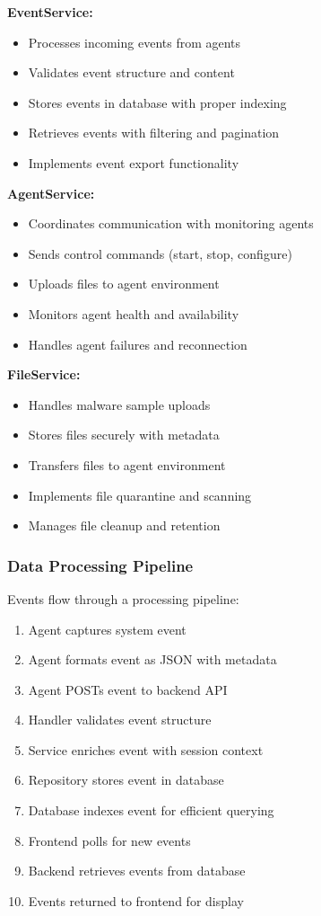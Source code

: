 \textbf{EventService:}
\begin{itemize}
    \item Processes incoming events from agents
    \item Validates event structure and content
    \item Stores events in database with proper indexing
    \item Retrieves events with filtering and pagination
    \item Implements event export functionality
\end{itemize}

\textbf{AgentService:}
\begin{itemize}
    \item Coordinates communication with monitoring agents
    \item Sends control commands (start, stop, configure)
    \item Uploads files to agent environment
    \item Monitors agent health and availability
    \item Handles agent failures and reconnection
\end{itemize}

\textbf{FileService:}
\begin{itemize}
    \item Handles malware sample uploads
    \item Stores files securely with metadata
    \item Transfers files to agent environment
    \item Implements file quarantine and scanning
    \item Manages file cleanup and retention
\end{itemize}

\subsubsection{Data Processing Pipeline}

Events flow through a processing pipeline:

\begin{enumerate}
    \item Agent captures system event
    \item Agent formats event as JSON with metadata
    \item Agent POSTs event to backend API
    \item Handler validates event structure
    \item Service enriches event with session context
    \item Repository stores event in database
    \item Database indexes event for efficient querying
    \item Frontend polls for new events
    \item Backend retrieves events from database
    \item Events returned to frontend for display
\end{enumerate}

